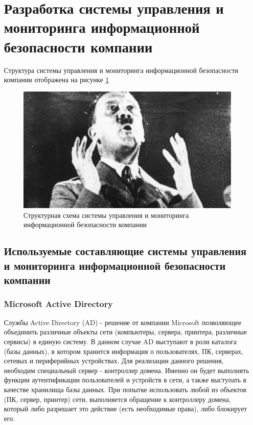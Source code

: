 \section{Разработка системы управления и мониторинга информационной безопасности компании}
\label{sec:development}
Структура системы управления и мониторинга информационной безопасности компании отображена на рисунке \ref{struct}

\begin{figure}[H]
  \centering
  \includegraphics[width=1\textwidth]{resources/2.jpg}
  \caption{Структурная схема системы управления и мониторинга информационной безопасности компании}
  \label{struct}
\end{figure}

\subsection{Используемые составляющие системы управления и мониторинга информационной безопасности компании}

\subsubsection{Microsoft Active Directory}
Службы Active Directory (AD) - решение от компании Microsoft позволяющее объединить различные объекты сети (компьютеры, сервера, принтера, различные сервисы) в единую систему. В данном случае AD выступают в роли каталога (базы данных), в котором хранится информация о пользователях, ПК, серверах, сетевых и периферийных устройствах.
Для реализации данного решения, необходим специальный сервер - контроллер домена. Именно он будет выполнять функции аутентификации пользователей и устройств в сети, а также выступать в качестве хранилища базы данных. При попытке использовать любой из объектов (ПК, сервер, принтер) сети, выполняется обращение к контроллеру домена, который либо разрешает это действие (есть необходимые права), либо блокирует его.

